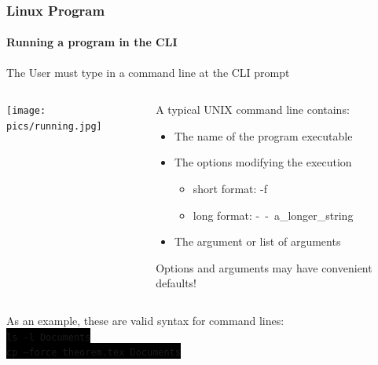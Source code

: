 \documentclass[unknownkeysallowed, 10pt, a4 paper, handout]{beamer}
\newcommand{\code}[1]{\colorbox{black}{\color{green}\texttt{#1}}}
\begin{document}
\begin{frame}[label=program]
  \frametitle{Linux Program}
  \framesubtitle{Running a program in the CLI}
  The User must type in a command line at the CLI prompt
  \vspace{5mm} \\
  \begin{columns}[T]
    \begin{column}{.39\textwidth}
      \texttt{[image: pics/running.jpg]}
    \end{column}
    \begin{column}{.61\textwidth}
      A typical UNIX command line contains:
      \begin{block}{}
        \begin{itemize}
          \item The name of the program executable
          \item The options modifying the execution
            \begin{itemize}
              \item short format: -f
              \item long format: -\ -\ a\_longer\_string
            \end{itemize}
          \item The argument or list of arguments
        \end{itemize}
      \end{block}
      \begin{alertblock}{}
        Options and arguments may have convenient defaults!
      \end{alertblock}
    \end{column}
  \end{columns}
  As an example, these are valid syntax for command lines:
  \vspace{3mm} \\
  \code{ls -l Documents} \\
  \code{cp --force theorem.tex Documents}
\end{frame}
\end{document}
